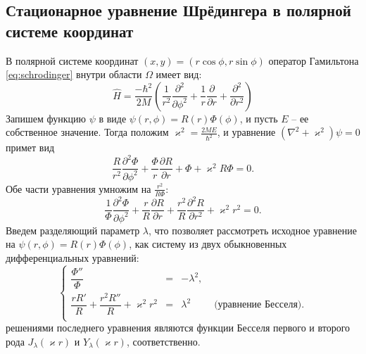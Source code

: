 \subsection{Стационарное уравнение Шрёдингера в полярной системе координат}\label{sec:ch1/sec1/sub1}
В полярной системе координат $(x, y) = (r\cos \phi, r\sin \phi)$ оператор Гамильтона \eqref{eq:schrodinger} внутри области $\Omega$ имеет вид:
\begin{equation*}
\hat{H} = \frac{-\hbar^2}{2M} \left(\frac{1}{r^2}\frac{\partial^2}{\partial \phi^2} + \frac{1}{r}\frac{\partial}{\partial r} + \frac{\partial^2}{\partial r^2}\right) 
\end{equation*}
Запишем функцию $\psi$ в виде $\psi(r, \phi) = R(r)\Phi(\phi)$, и пусть $E$ -- ее собственное значение. Тогда положим $\varkappa^2 = \frac{2M E}{\hbar^2}$, и уравнение $(\nabla^2  + \varkappa^2) \psi=0$ примет вид 
$$ \frac{R}{r^2}\frac{\partial^2\Phi}{\partial\phi^2} + \frac{\Phi}{r}\frac{\partial R}{\partial r} + \Phi  +\varkappa^2R\Phi = 0.$$
Обе части уравнения умножим на $\frac{r^2}{R\Phi}$:
$$ \frac{1}{\Phi}\frac{\partial^2\Phi}{\partial\phi^2} + \frac{r}{R}\frac{\partial R}{\partial r} + \frac{r^2}{R}\frac{\partial^2 R}{\partial r^2} + \varkappa^2r^2 = 0.$$
Введем разделяющий параметр $\lambda$, что позволяет рассмотреть исходное уравнение на $\psi(r, \phi) = R(r)\Phi(\phi)$, как систему из двух обыкновенных дифференциальных уравнений:
\begin{equation}
\left\{\begin{array}{rcll}
    \dfrac{\Phi''}{\Phi} &=&-\lambda^2, \\
    \dfrac{rR'}{R} + \dfrac{r^2R''}{R} + \varkappa^2r^2 &=& \lambda^2  \quad 	 &\textit{   (уравнение Бесселя)}. \\
\end{array}
\right.
\label{eq:Bessel_equations}
\end{equation}
решениями последнего уравнения являются функции Бесселя первого и второго рода $J_\lambda(\varkappa r)$ и $Y_\lambda(\varkappa r)$, соответственно. 


